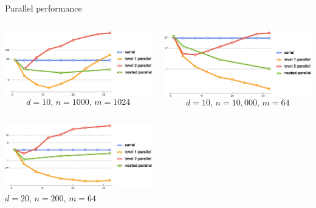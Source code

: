 \documentclass[xcolor=dvipsnames]{beamer}
\begin{document}
\begin{frame}{Parallel performance}
\bigskip
\medskip
\begin{columns}
\begin{column}{.48\textwidth}
\includegraphics[width=\textwidth]{d10n1000m1024.eps}
$$
d=10\text{, }n=1000\text{, }m=1024
$$
\end{column}
\begin{column}{.48\textwidth}
\includegraphics[width=\textwidth]{d10n10000m64.eps}
$$
d=10\text{, }n=10,000\text{, }m=64
$$
\end{column}
\end{columns}
\begin{center}
\includegraphics[width=0.48\textwidth]{d20n200m64.eps}\\
$d=20\text{, }n=200\text{, }m=64$
\end{center}
\end{frame}
\end{document}
